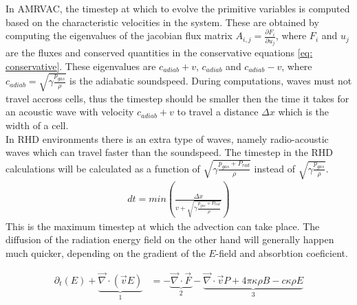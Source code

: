 In AMRVAC, the timestep at which to evolve the primitive variables is computed based on the characteristic velocities in the system. These are obtained by computing the eigenvalues of the jacobian flux matrix $A_{i,j} = \frac{\partial F_i}{\partial u_j}$, where $F_i$ and $u_j$ are the fluxes and conserved quantities in the conservative equations \eqref{eq: conservative}. These eigenvalues are $c_{adiab} + v$, $c_{adiab}$ and $c_{adiab} - v$, where $c_{adiab} = \sqrt{\gamma\frac{p_{gas}}{\rho}}$ is the adiabatic soundspeed. During computations, waves must not travel accross cells, thus the timestep should be smaller then the time it takes for an acoustic wave with velocity $c_{adiab} + v$ to travel a distance $\Delta x$ which is the width of a cell.\\
In RHD environments there is an extra type of waves, namely radio-acoustic waves which can travel faster than the soundspeed. The timestep in the RHD calculations will be calculated as a function of $\sqrt{\gamma\frac{p_{gas} + P_{rad}}{\rho}}$ instead of $\sqrt{\gamma\frac{p_{gas}}{\rho}}$.
\begin{align}
dt = min \left(\frac{\Delta x}{v + \sqrt{\gamma\frac{p_{gas} + P_{rad}}{\rho}}} \right)
\end{align}
This is the maximum timestep at which the advection can take place. The diffusion of the radiation energy field on the other hand will generally happen much quicker, depending on the gradient of the $E$-field and absorbtion coeficient.

\begin{align}
\partial_t \left(E \right) + \underbrace{\vec{\nabla} \cdot \left( \vec{v} E \right)}_{1}  &= - \underbrace{\vec{\nabla} \cdot \vec{F}}_{2} - \underbrace{\vec{\nabla} \cdot \vec{v} P + 4\pi \kappa\rho B - c \kappa \rho E}_{3} \\
\end{align} 

